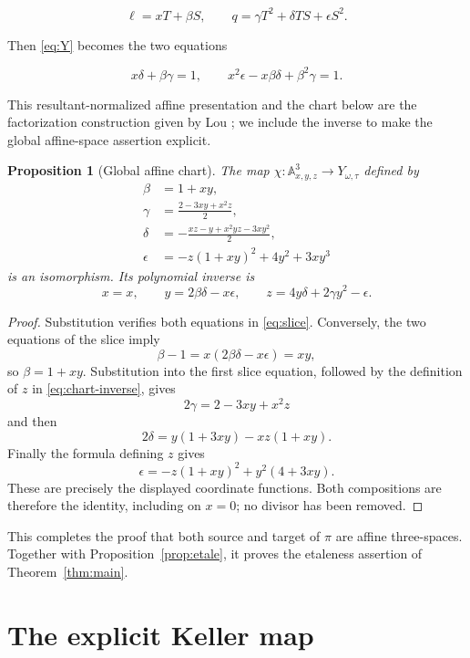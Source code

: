 \documentclass[11pt,a4paper]{article}
\newtheorem{proposition}[theorem]{Proposition}
\theoremstyle{remark}
\newcommand{\A}{\mathbb A}
\begin{document}
\[
  \ell=xT+\beta S,
  \qquad
  q=\gamma T^2+\delta TS+\epsilon S^2.
\]

Then \eqref{eq:Y} becomes the two equations

\begin{equation}\label{eq:slice}
  x\delta+\beta\gamma=1,
  \qquad
  x^2\epsilon-x\beta\delta+\beta^2\gamma=1.
\end{equation}

This resultant-normalized affine presentation and the chart below are the
factorization construction given by Lou \cite{Lou}; we include the inverse to
make the global affine-space assertion explicit.

\begin{proposition}[Global affine chart]\label{prop:chart}
The map $\chi\colon\A^3_{x,y,z}\to Y_{\omega,\tau}$ defined by
\begin{align*}
  \beta&=1+xy,\\
  \gamma&=\frac{2-3xy+x^2z}{2},\\
  \delta&=-\frac{xz-y+x^2yz-3xy^2}{2},\\
  \epsilon&=-z(1+xy)^2+4y^2+3xy^3
\end{align*}
is an isomorphism.  Its polynomial inverse is
\begin{equation}\label{eq:chart-inverse}
  x=x,\qquad
  y=2\beta\delta-x\epsilon,
  \qquad
  z=4y\delta+2\gamma y^2-\epsilon.
\end{equation}
\end{proposition}

\begin{proof}
Substitution verifies both equations in \eqref{eq:slice}.  Conversely, the
two equations of the slice imply
\[
  \beta-1=x(2\beta\delta-x\epsilon)=xy,
\]
so $\beta=1+xy$.  Substitution into the first slice equation, followed by
the definition of $z$ in \eqref{eq:chart-inverse}, gives
\[
  2\gamma=2-3xy+x^2z
\]
and then
\[
  2\delta=y(1+3xy)-xz(1+xy).
\]
Finally the formula defining $z$ gives
\[
  \epsilon=-z(1+xy)^2+y^2(4+3xy).
\]
These are precisely the displayed coordinate functions.  Both compositions
are therefore the identity, including on $x=0$; no divisor has been removed.
\end{proof}

This completes the proof that both source and target of $\pi$ are affine
three-spaces.  Together with Proposition~\ref{prop:etale}, it proves the
etaleness assertion of Theorem~\ref{thm:main}.

\section{The explicit Keller map}
\end{document}
